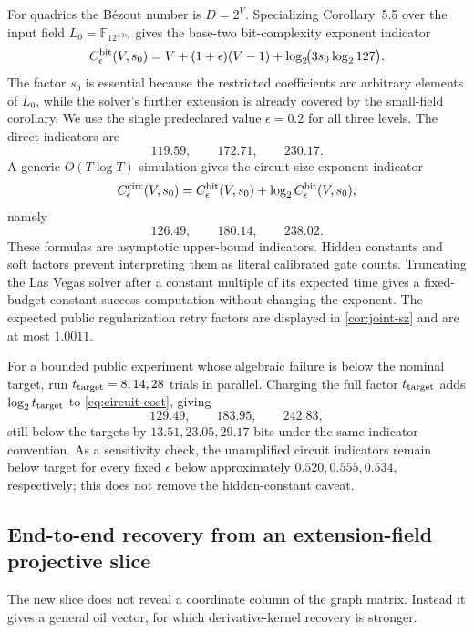 \documentclass[10pt,a4paper]{article}
\newcommand{\F}{\mathbb F}
\begin{document}
For quadrics the B\'ezout number is $D=2^V$.  Specializing Corollary~5.5 over the input field $L_0=\F_{127^{3s_0}}$ gives the base-two bit-complexity exponent indicator
\begin{equation}\label{eq:fast-cost}
C^{\rm bit}_{\epsilon}(V,s_0)
=V+(1+\epsilon)(V-1)+\log_2\!\bigl(3s_0\log_2 127\bigr).
\end{equation}
The factor $s_0$ is essential because the restricted coefficients are arbitrary elements of $L_0$, while the solver's further extension is already covered by the small-field corollary.  We use the single predeclared value $\epsilon=0.2$ for all three levels.  The direct indicators are
\[
119.59,\qquad172.71,\qquad230.17.
\]
A generic $O(T\log T)$ simulation gives the circuit-size exponent indicator
\begin{equation}\label{eq:circuit-cost}
C^{\rm circ}_{\epsilon}(V,s_0)
=C^{\rm bit}_{\epsilon}(V,s_0)+\log_2 C^{\rm bit}_{\epsilon}(V,s_0),
\end{equation}
namely
\[
126.49,\qquad180.14,\qquad238.02.
\]
These formulas are asymptotic upper-bound indicators.  Hidden constants and soft factors prevent interpreting them as literal calibrated gate counts.  Truncating the Las Vegas solver after a constant multiple of its expected time gives a fixed-budget constant-success computation without changing the exponent.  The expected public regularization retry factors are displayed in \cref{cor:joint-sz} and are at most $1.0011$.

For a bounded public experiment whose algebraic failure is below the nominal target, run $t_{\rm target}=8,14,28$ trials in parallel.  Charging the full factor $t_{\rm target}$ adds $\log_2t_{\rm target}$ to \eqref{eq:circuit-cost}, giving
\[
129.49,\qquad183.95,\qquad242.83,
\]
still below the targets by $13.51,23.05,29.17$ bits under the same indicator convention.  As a sensitivity check, the unamplified circuit indicators remain below target for every fixed $\epsilon$ below approximately $0.520,0.555,0.534$, respectively; this does not remove the hidden-constant caveat.

\subsection{End-to-end recovery from an extension-field projective slice}

The new slice does not reveal a coordinate column of the graph matrix.  Instead it gives a general oil vector, for which derivative-kernel recovery is stronger.
\end{document}
